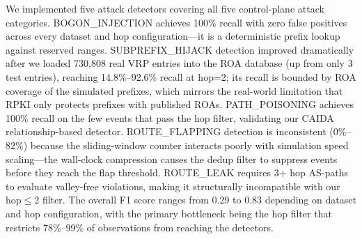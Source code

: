 \documentclass[11pt,a4paper]{article}
\begin{document}
We implemented five attack detectors covering all five control-plane attack categories. BOGON\_INJECTION achieves 100\% recall with zero false positives across every dataset and hop configuration---it is a deterministic prefix lookup against reserved ranges. SUBPREFIX\_HIJACK detection improved dramatically after we loaded 730,808 real VRP entries into the ROA database (up from only 3 test entries), reaching 14.8\%--92.6\% recall at hop=2; its recall is bounded by ROA coverage of the simulated prefixes, which mirrors the real-world limitation that RPKI only protects prefixes with published ROAs. PATH\_POISONING achieves 100\% recall on the few events that pass the hop filter, validating our CAIDA relationship-based detector. ROUTE\_FLAPPING detection is inconsistent (0\%--82\%) because the sliding-window counter interacts poorly with simulation speed scaling---the wall-clock compression causes the dedup filter to suppress events before they reach the flap threshold. ROUTE\_LEAK requires 3+ hop AS-paths to evaluate valley-free violations, making it structurally incompatible with our hop$\leq$2 filter. The overall F1 score ranges from 0.29 to 0.83 depending on dataset and hop configuration, with the primary bottleneck being the hop filter that restricts 78\%--99\% of observations from reaching the detectors.
\end{document}
